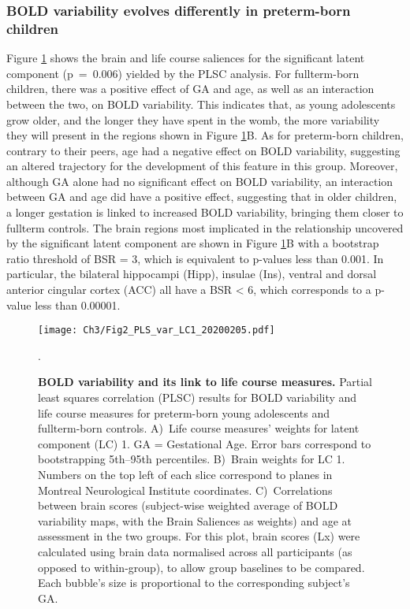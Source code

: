 \subsubsection*{BOLD variability evolves differently in preterm-born children} 
Figure \ref{fig:PLS_var} shows the brain and life course saliences for the significant latent component (p~=~0.006) yielded by the PLSC analysis. For fullterm-born children, there was a positive effect of GA and age, as well as an interaction between the two, on BOLD variability. This indicates that, as young adolescents grow older, and the longer they have spent in the womb, the more variability they will present in the regions shown in Figure \ref{fig:PLS_var}B. As for preterm-born children, contrary to their peers, age had a negative effect on BOLD variability, suggesting an altered trajectory for the development of this feature in this group. Moreover, although GA alone had no significant effect on BOLD variability, an interaction between GA and age did have a positive effect, suggesting that in older children, a longer gestation is linked to increased BOLD variability, bringing them closer to fullterm controls. The brain regions most implicated in the relationship uncovered by the significant latent component are shown in  Figure \ref{fig:PLS_var}B with a bootstrap ratio threshold of BSR = 3, which is equivalent to p-values less than 0.001.  In particular, the bilateral hippocampi (Hipp), insulae (Ins), ventral and dorsal anterior cingular cortex (ACC) all have a BSR < 6, which corresponds to a p-value less than 0.00001.



\begin{figure}[h!] 
\centering\texttt{[image: Ch3/Fig2\_PLS\_var\_LC1\_20200205.pdf]}
\caption{\textbf{BOLD variability and its link to life course measures.} Partial least squares correlation (PLSC) results for BOLD variability and life course measures for preterm-born young adolescents and fullterm-born controls.  A)~Life course measures' weights for latent component (LC) 1. GA = Gestational Age. Error bars correspond to bootstrapping 5th--95th percentiles. B)~Brain weights for LC 1. Numbers on the top left of each slice correspond to planes in Montreal Neurological Institute coordinates. C)~Correlations between brain scores (subject-wise weighted average of BOLD variability maps, with the Brain Saliences as weights) and age at assessment in the two groups. For this plot, brain scores (Lx) were calculated using brain data normalised across all participants (as opposed to within-group), to allow group baselines to be compared. Each bubble's size is proportional to the corresponding subject's GA. %
}. \label{fig:PLS_var} \vspace{-0.5cm}
\end{figure}



